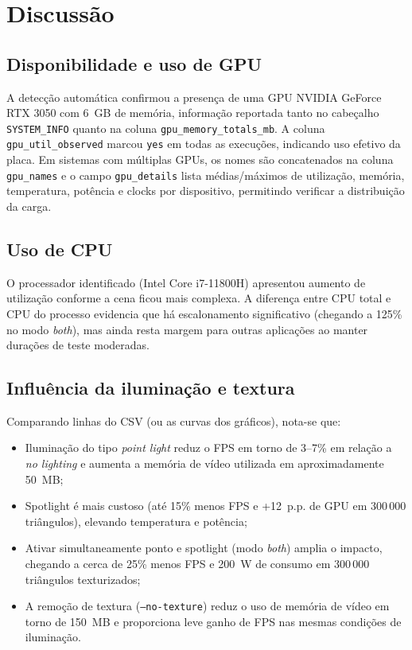 \documentclass[11pt,a4paper]{article}
\begin{document}
\section{Discussão}
\subsection{Disponibilidade e uso de GPU}
A detecção automática confirmou a presença de uma GPU NVIDIA GeForce RTX 3050 com
6~GB de memória, informação reportada tanto no cabeçalho \texttt{SYSTEM\_INFO}
quanto na coluna \texttt{gpu\_memory\_totals\_mb}. A coluna
\texttt{gpu\_util\_observed} marcou \texttt{yes} em todas as execuções,
indicando uso efetivo da placa. Em sistemas com múltiplas GPUs, os nomes são
concatenados na coluna \texttt{gpu\_names} e o campo \texttt{gpu\_details}
lista médias/máximos de utilização, memória, temperatura, potência e clocks por
dispositivo, permitindo verificar a distribuição da carga.

\subsection{Uso de CPU}
O processador identificado (Intel Core i7-11800H) apresentou aumento de utilização
conforme a cena ficou mais complexa. A diferença entre CPU total e CPU do
processo evidencia que há escalonamento significativo (chegando a 125\% no modo
\emph{both}), mas ainda resta margem para outras aplicações ao manter durações
de teste moderadas.

\subsection{Influência da iluminação e textura}
Comparando linhas do CSV (ou as curvas dos gráficos), nota-se que:

\begin{itemize}
  \item Iluminação do tipo \emph{point light} reduz o FPS em torno de 3--7\% em
        relação a \emph{no lighting} e aumenta a memória de vídeo utilizada em
        aproximadamente 50~MB;
  \item Spotlight é mais custoso (até 15\% menos FPS e +12~p.p. de GPU em
        300\,000 triângulos), elevando temperatura e potência;
  \item Ativar simultaneamente ponto e spotlight (modo \emph{both}) amplia o
        impacto, chegando a cerca de 25\% menos FPS e 200~W de consumo em 300\,000
        triângulos texturizados;
  \item A remoção de textura (\texttt{--no-texture}) reduz o uso de memória de
        vídeo em torno de 150~MB e proporciona leve ganho de FPS nas mesmas
        condições de iluminação.
\end{itemize}
\end{document}
